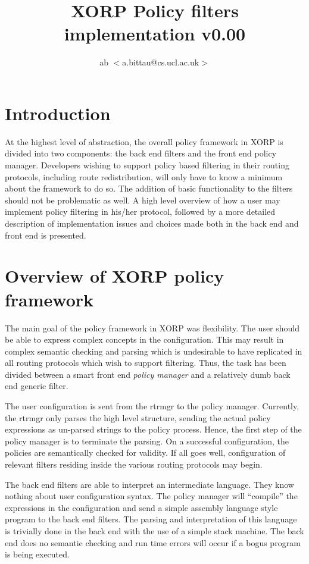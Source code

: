 \documentclass{article}
\title{XORP Policy filters\\implementation v0.00}
\author{ab $<$a.bittau@cs.ucl.ac.uk$>$}
\begin{document}
\maketitle

\section{Introduction}
At the highest level of abstraction, the overall policy framework in XORP is
divided into two components: the back end filters and the front end policy
manager. Developers wishing to support policy based filtering in their routing
protocols, including route redistribution, will only have to know a minimum
about the framework to do so. The addition of basic functionality to the filters
should not be problematic as well. A high level overview of how a user may
implement policy filtering in his/her protocol, followed by a more detailed
description of implementation issues and choices made both in the back end and
front end is presented.


\section{Overview of XORP policy framework}
The main goal of the policy framework in XORP was flexibility. The user should
be able to express complex concepts in the configuration. This may result in
complex semantic checking and parsing which is undesirable to have replicated in
all routing protocols which wish to support filtering. Thus, the task has been
divided between a smart front end {\em policy manager} and a relatively dumb
back end generic filter.

The user configuration is sent from the rtrmgr to the policy manager. Currently,
the rtrmgr only parses the high level structure, sending the actual policy
expressions as un-parsed strings to the policy process. Hence, the first step of
the policy manager is to terminate the parsing. On a successful configuration,
the policies are semantically checked for validity. If all goes well,
configuration of relevant filters residing inside the various routing protocols
may begin.

The back end filters are able to interpret an intermediate language. They know
nothing about user configuration syntax. The policy manager will ``compile'' the
expressions in the configuration and send a simple assembly language style
program to the back end filters. The parsing and interpretation of this language
is trivially done in the back end with the use of a simple stack machine. The
back end does no semantic checking and run time errors will occur if a bogus
program is being executed.
\end{document}
